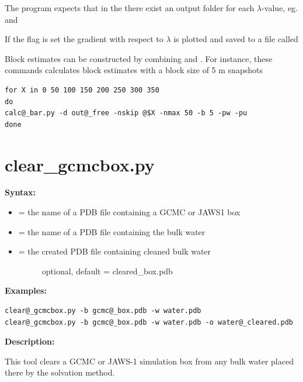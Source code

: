 \documentclass[letterpaper,10pt,english]{manual}
\begin{document}
The program expects that in the  there exist an output folder for each $\lambda$-value, eg.  and 

If the  flag is set the gradient with respect to $\lambda$ is plotted and saved to a file called 

Block estimates can be constructed by combining  and . For instance, these commands calculates block estimates with a block size of 5 m snapshots

\begin{Verbatim}[commandchars=@\[\]]
for X in 0 50 100 150 200 250 300 350
do
calc@_bar.py -d out@_free -nskip @$X -nmax 50 -b 5 -pw -pu
done
\end{Verbatim}


\section{clear\_gcmcbox.py}

\textbf{Syntax:}

\begin{itemize}
\item {} 
 = the name of a PDB file containing a GCMC or JAWS1 box

\item {} 
 = the name of a PDB file containing the bulk water

\item {} \begin{description}
\item[{ = the created PDB file containing cleaned bulk water}] \leavevmode
optional, default = cleared\_box.pdb

\end{description}

\end{itemize}

\textbf{Examples:}

\begin{Verbatim}[commandchars=@\[\]]
clear@_gcmcbox.py -b gcmc@_box.pdb -w water.pdb
clear@_gcmcbox.py -b gcmc@_box.pdb -w water.pdb -o water@_cleared.pdb
\end{Verbatim}

\textbf{Description:}

This tool clears a GCMC or JAWS-1 simulation box from any bulk water placed there by the solvation method.
\end{document}
